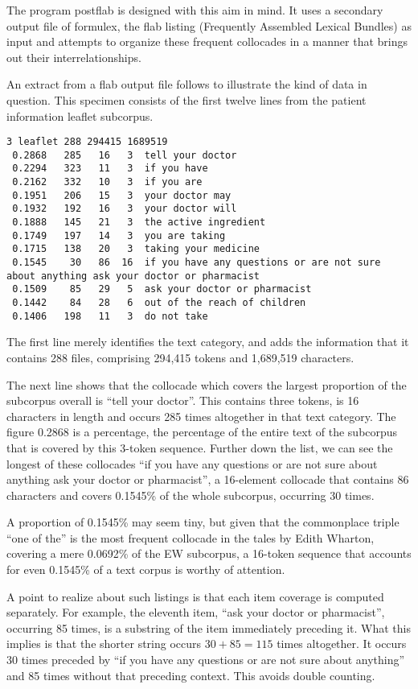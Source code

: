\documentclass[output=paper]{langscibook}
\begin{document}
The program postflab is designed with this aim in mind. It uses a secondary output file of formulex, the flab listing (Frequently Assembled Lexical Bundles) as input and attempts to organize these frequent collocades in a manner that brings out their interrelationships.

An extract from a flab output file follows to illustrate the kind of data in question. This specimen consists of the first twelve lines from the patient information leaflet subcorpus.\bigskip

\begin{lstlisting}
3 leaflet 288 294415 1689519
 0.2868   285   16   3  tell your doctor
 0.2294   323   11   3  if you have
 0.2162   332   10   3  if you are
 0.1951   206   15   3  your doctor may
 0.1932   192   16   3  your doctor will
 0.1888   145   21   3  the active ingredient
 0.1749   197   14   3  you are taking
 0.1715   138   20   3  taking your medicine
 0.1545    30   86  16  if you have any questions or are not sure about anything ask your doctor or pharmacist
 0.1509    85   29   5  ask your doctor or pharmacist
 0.1442    84   28   6  out of the reach of children
 0.1406   198   11   3  do not take
\end{lstlisting}

The first line merely identifies the text category, and adds the information that it contains 288 files, comprising 294,415 tokens and 1,689,519 characters.

The next line shows that the collocade which covers the largest proportion of the subcorpus overall is ``tell your doctor''. This contains three tokens, is 16 characters in length and occurs 285 times altogether in that text category. The figure 0.2868 is a percentage, the percentage of the entire text of the subcorpus that is covered by this 3-token sequence. Further down the list, we can see the longest of these collocades ``if you have any questions or are not sure about anything ask your doctor or pharmacist'', a 16-element collocade that contains 86 characters and covers 0.1545\% of the whole subcorpus, occurring 30 times.

A proportion of 0.1545\% may seem tiny, but given that the commonplace triple ``one of the'' is the most frequent collocade in the tales by Edith Wharton, covering a mere 0.0692\% of the EW subcorpus, a 16-token sequence that accounts for even 0.1545\% of a text corpus is worthy of attention.

A point to realize about such listings is that each item coverage is computed separately. For example, the eleventh item, ``ask your doctor or pharmacist'', occurring 85 times, is a substring of the item immediately preceding it. What this implies is that the shorter string occurs $30+85 = 115$ times altogether. It occurs 30 times preceded by ``if you have any questions or are not sure about anything'' and 85 times without that preceding context. This avoids double counting.
\end{document}
